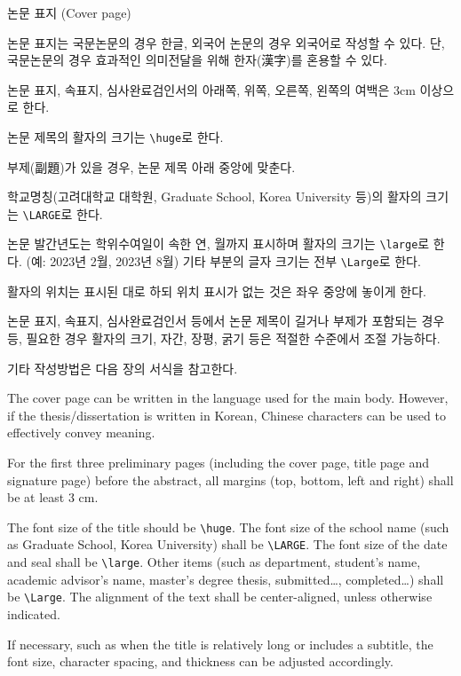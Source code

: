 \documentclass[11pt]{report}
\numberwithin{figure}{chapter}
\theoremstyle{plain}
\theoremstyle{definition}
\theoremstyle{corollary}
\theoremstyle{definition}
\theoremstyle{plain}
\theoremstyle{definition}
\theoremstyle{plain}
\begin{document}
\onehalfspacing
\renewcommand{\arraystretch}{1.5}

\begin{center}
\large 논문 표지 (Cover page)
\end{center}
논문 표지는 국문논문의 경우 한글, 외국어 논문의 경우 외국어로 작성할 수 있다.
단, 국문논문의 경우 효과적인 의미전달을 위해 한자(漢字)를 혼용할 수 있다.

논문 표지, 속표지, 심사완료검인서의 아래쪽, 위쪽, 오른쪽, 왼쪽의 여백은 3cm 이상으로 한다.

논문 제목의 활자의 크기는 \verb|\huge|로 한다.

부제(副題)가 있을 경우, 논문 제목 아래 중앙에 맞춘다.

학교명칭(고려대학교 대학원, Graduate School, Korea University 등)의 활자의 크기는 \verb|\LARGE|로 한다.

논문 발간년도는 학위수여일이 속한 연, 월까지 표시하며 활자의 크기는 \verb|\large|로 한다. (예: 2023년 2월, 2023년 8월) 
기타 부분의 글자 크기는 전부 \verb|\Large|로 한다.

활자의 위치는 표시된 대로 하되 위치 표시가 없는 것은 좌우 중앙에 놓이게 한다.

논문 표지, 속표지, 심사완료검인서 등에서 논문 제목이 길거나 부제가 포함되는 경우 등, 필요한 경우 활자의 크기, 자간, 장평, 굵기 등은 적절한 수준에서 조절 가능하다.

기타 작성방법은 다음 장의 서식을 참고한다.

\bigskip

The cover page can be written in the language used for the main body.
However, if the thesis/dissertation is written in Korean, Chinese characters can be used to effectively convey meaning.

For the first three preliminary pages (including the cover page, title page and signature page) before the abstract, all margins (top, bottom, left and right) shall be at least 3 cm.

The font size of the title should be \verb|\huge|.
The font size of the school name (such as Graduate School, Korea University) shall be \verb|\LARGE|.
The font size of the date and seal shall be \verb|\large|.
Other items (such as department, student’s name, academic advisor’s name, master’s degree thesis, submitted…, completed…) shall be \verb|\Large|.
The alignment of the text shall be center-aligned, unless otherwise indicated.

If necessary, such as when the title is relatively long or includes a subtitle, the font size, character spacing, and thickness can be adjusted accordingly.
\end{document}
